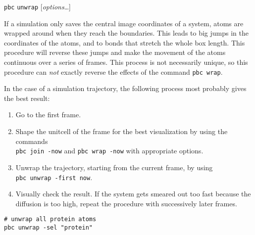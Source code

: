 \documentclass[a4paper, DIV12]{scrartcl}
\begin{document}
\texttt{pbc} \texttt{unwrap} [\textit{options}\dots]


If a simulation only saves the central image coordinates of a system,
atoms are wrapped around when they reach the boundaries.  This leads
to big jumps in the coordinates of the atoms, and to bonds that
stretch the whole box length. This procedure will reverse these jumps
and make the movement of the atoms continuous over a series of
frames. This process is not necessarily unique, so this procedure can
\emph{not} exactly reverse the effects of the command \texttt{pbc
  wrap}.

In the case of a simulation trajectory, the following process most
probably gives the best result:
\begin{enumerate}
\item Go to the first frame.
\item \label{shape} Shape the unitcell of the frame for the best
  visualization by using the commands\\ \mbox{\texttt{pbc join -now}}
  and \mbox{\texttt{pbc wrap -now}} with appropriate options.
\item Unwrap the trajectory, starting from the current frame, by using\\
  \mbox{\texttt{pbc unwrap -first now}}.
\item Visually check the result. If the system gets smeared out too
  fast because the diffusion is too high, repeat the procedure with
  successively later frames.
\end{enumerate}


\begin{Verbatim}
# unwrap all protein atoms
pbc unwrap -sel "protein"
\end{Verbatim}

\end{document}
